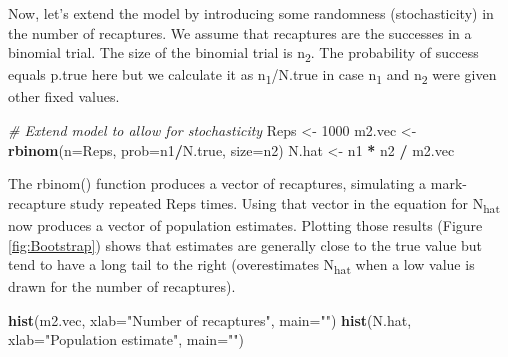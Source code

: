 \documentclass[
]{krantz}
\makeatletter
\newenvironment{Shaded}{\begin{snugshade}}{\end{snugshade}}
\newcommand{\AttributeTok}[1]{\textcolor[rgb]{0.27,0.27,0.27}{#1}}
\newcommand{\CommentTok}[1]{\textcolor[rgb]{0.37,0.37,0.37}{\textit{#1}}}
\newcommand{\DecValTok}[1]{\textcolor[rgb]{0.06,0.06,0.06}{#1}}
\newcommand{\FunctionTok}[1]{\textcolor[rgb]{0.27,0.27,0.27}{\textbf{#1}}}
\newcommand{\NormalTok}[1]{#1}
\newcommand{\OtherTok}[1]{\textcolor[rgb]{0.37,0.37,0.37}{#1}}
\newcommand{\SpecialCharTok}[1]{\textcolor[rgb]{0.43,0.43,0.43}{\textbf{#1}}}
\newcommand{\StringTok}[1]{\textcolor[rgb]{0.5,0.5,0.5}{#1}}
\newenvironment{kframe}{%
\medskip{}
\setlength{\fboxsep}{.8em}
 \def\at@end@of@kframe{}%
 \ifinner\ifhmode%
  \def\at@end@of@kframe{\end{minipage}}%
  \begin{minipage}{\columnwidth}%
 \fi\fi%
 \def\FrameCommand##1{\hskip\@totalleftmargin \hskip-\fboxsep
 \colorbox{shadecolor}{##1}\hskip-\fboxsep
     \hskip-\linewidth \hskip-\@totalleftmargin \hskip\columnwidth}%
 \MakeFramed {\advance\hsize-\width
   \@totalleftmargin\z@ \linewidth\hsize
   \@setminipage}}%
 {\par\unskip\endMakeFramed%
 \at@end@of@kframe}
\renewenvironment{Shaded}{\begin{kframe}}{\end{kframe}}
\makeatother
\begin{document}
Now, let's extend the model by introducing some randomness (stochasticity) in the number of recaptures. We assume that recaptures are the successes in a binomial trial. The size of the binomial trial is n\textsubscript{2}. The probability of success equals p.true here but we calculate it as n\textsubscript{1}/N.true in case n\textsubscript{1} and n\textsubscript{2} were given other fixed values.

\begin{Shaded}
\begin{Highlighting}[]
\CommentTok{\# Extend model to allow for stochasticity}
\NormalTok{Reps }\OtherTok{\textless{}{-}} \DecValTok{1000}
\NormalTok{m2.vec }\OtherTok{\textless{}{-}} \FunctionTok{rbinom}\NormalTok{(}\AttributeTok{n=}\NormalTok{Reps, }\AttributeTok{prob=}\NormalTok{n1}\SpecialCharTok{/}\NormalTok{N.true, }\AttributeTok{size=}\NormalTok{n2)}
\NormalTok{N.hat }\OtherTok{\textless{}{-}}\NormalTok{ n1 }\SpecialCharTok{*}\NormalTok{ n2 }\SpecialCharTok{/}\NormalTok{ m2.vec}
\end{Highlighting}
\end{Shaded}

The rbinom() function produces a vector of recaptures, simulating a mark-recapture study repeated Reps times. Using that vector in the equation for N\textsubscript{hat} now produces a vector of population estimates. Plotting those results (Figure \ref{fig:Bootstrap}) shows that estimates are generally close to the true value but tend to have a long tail to the right (overestimates N\textsubscript{hat} when a low value is drawn for the number of recaptures).

\begin{Shaded}
\begin{Highlighting}[]
\FunctionTok{hist}\NormalTok{(m2.vec, }\AttributeTok{xlab=}\StringTok{"Number of recaptures"}\NormalTok{, }\AttributeTok{main=}\StringTok{""}\NormalTok{)}
\FunctionTok{hist}\NormalTok{(N.hat, }\AttributeTok{xlab=}\StringTok{"Population estimate"}\NormalTok{, }\AttributeTok{main=}\StringTok{""}\NormalTok{)}
\end{Highlighting}
\end{Shaded}
\end{document}
